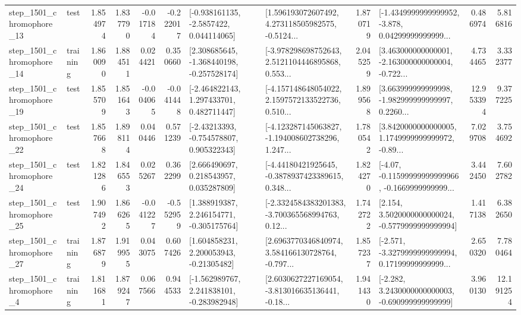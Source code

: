 \begin{tabular}{llrrrrllrlrr}
 step\_1501\_chromophore\_13 &      test &      1.854974 &    1.837790 &     -0.017184 & -0.222017 &     [-0.938161135, -2.5857422, 0.044114065] &  [1.596193072607492, 4.273118505982575, -0.5124... &       1.870719 &  [-1.4349999999999952, -3.878, 0.04299999999999... &            0.486974 &          5.816816 \\
 step\_1501\_chromophore\_14 &  training &      1.860090 &    1.884511 &      0.024421 &  0.350660 &   [2.308685645, -1.368440198, -0.257528174] &  [-3.978298698752643, 2.5121104446895868, 0.553... &       2.045259 &  [3.463000000000001, -2.163000000000004, -0.722... &            4.734465 &          3.332377 \\
 step\_1501\_chromophore\_19 &      test &      1.855709 &    1.851643 &     -0.004065 & -0.041448 &    [-2.464822143, 1.297433701, 0.482711447] &  [-4.157148648054022, 2.1597572133522736, 0.510... &       1.899568 &  [3.663999999999998, -1.982999999999997, 0.2260... &           12.953394 &          9.377225 \\
 step\_1501\_chromophore\_22 &      test &      1.857668 &    1.898114 &      0.040446 &  0.571239 &    [-2.43213393, -0.754578807, 0.905322343] &  [-4.123287145063827, -1.194008602738296, 1.247... &       1.780542 &  [3.8420000000000005, 1.1749999999999972, -0.89... &            7.029708 &          3.754692 \\
 step\_1501\_chromophore\_24 &      test &      1.821286 &    1.846553 &      0.025267 &  0.362299 &     [2.666490697, 0.218543957, 0.035287809] &  [-4.44180421925645, -0.3878937423389615, 0.348... &       1.824270 &  [-4.07, -0.11599999999999966, -0.1669999999999... &            3.442450 &          7.602782 \\
 step\_1501\_chromophore\_25 &      test &      1.907492 &    1.866265 &     -0.041227 & -0.552959 &    [1.388919387, 2.246154771, -0.305175764] &  [-2.3324584383201383, -3.700365568994763, 0.12... &       1.742722 &   [2.154, 3.5020000000000024, -0.5779999999999994] &            1.417138 &          6.382650 \\
 step\_1501\_chromophore\_27 &  training &      1.876879 &    1.919955 &      0.043075 &  0.607426 &     [1.604858231, 2.200053943, -0.21305482] &  [2.6963770346840974, 3.584166130728764, -0.797... &       1.857237 &  [-2.571, -3.3279999999999994, 0.17199999999999... &            2.650320 &          7.780464 \\
  step\_1501\_chromophore\_4 &  training &      1.811681 &    1.879247 &      0.067566 &  0.944533 &   [-1.562989767, 2.241838101, -0.283982948] &  [2.6030627227169054, -3.813016635136441, -0.18... &       1.941430 &   [-2.282, 3.2430000000000003, -0.690999999999999] &            3.960130 &         12.191254 \\

\end{tabular}
